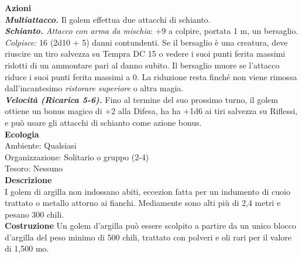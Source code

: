 \begin{multicols}{2}
\smallskip\textbf{Azioni} \\
\emph{\textbf{Multiattacco.}} Il golem effettua due attacchi di schianto.\\
\emph{\textbf{Schianto.} Attacco con arma da mischia}: +9 a colpire, portata 1 m, un bersaglio.\\
\emph{Colpisce:} 16 (2d10 + 5) danni contundenti. Se il bersaglio è una creatura, deve riuscire un tiro salvezza su Tempra DC 15 o vedere i suoi punti ferita massimi ridotti di un ammontare pari al danno subito. Il bersaglio muore se l'attacco riduce i suoi punti ferita massimi a 0. La riduzione resta finché non viene rimossa dall'incantesimo \emph{ristorare superiore} o altra magia.\\
\emph{\textbf{Velocità (Ricarica 5-6).}} Fino al termine del suo prossimo turno, il golem ottiene un bonus magico di +2 alla Difesa, ha ha +1d6 ai tiri salvezza su Riflessi, e può usare gli attacchi di schianto come azione bonus.\\
\textbf{Ecologia}\\
Ambiente: Qualsiasi\\
Organizzazione: Solitario o gruppo (2-4)\\
Tesoro: Nessuno\\
\textbf{Descrizione}\\
I golem di argilla non indossano abiti, eccezion fatta per un indumento di cuoio trattato o metallo attorno ai fianchi. Mediamente sono alti più di 2,4 metri e pesano 300 chili.\\
\textbf{Costruzione}
Un golem d'argilla può essere scolpito a partire da un unico blocco d'argilla del peso minimo di 500 chili, trattato con polveri e oli rari per il valore di 1,500 mo.\\


\end{multicols}
